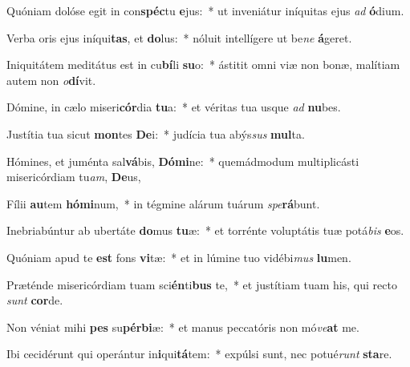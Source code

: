 \item Quóniam dolóse egit in con\textbf{spéc}tu \textbf{e}jus:~* ut inveniátur iníquitas ejus \textit{ad} \textbf{ó}dium.
\item Verba oris ejus iníqui\textbf{tas}, et \textbf{do}lus:~* nóluit intellígere ut be\textit{ne} \textbf{á}geret.
\item Iniquitátem meditátus est in cu\textbf{bí}li \textbf{su}o:~* ástitit omni viæ non bonæ, malítiam autem non \textit{o}\textbf{dí}vit.
\item Dómine, in cælo miseri\textbf{cór}dia \textbf{tu}a:~* et véritas tua usque \textit{ad} \textbf{nu}bes.
\item Justítia tua sicut \textbf{mon}tes \textbf{De}i:~* judícia tua abýs\textit{sus} \textbf{mul}ta.
\item Hómines, et juménta sal\textbf{vá}bis, \textbf{Dó}\textbf{mi}ne:~* quemádmodum multiplicásti misericórdiam tu\textit{am}, \textbf{De}us,
\item Fílii \textbf{au}tem \textbf{hó}\textbf{mi}num,~* in tégmine alárum tuárum \textit{spe}\textbf{rá}bunt.
\item Inebriabúntur ab ubertáte \textbf{do}mus \textbf{tu}æ:~* et torrénte voluptátis tuæ potá\textit{bis} \textbf{e}os.
\item Quóniam apud te \textbf{est} fons \textbf{vi}tæ:~* et in lúmine tuo vidébi\textit{mus} \textbf{lu}men.
\item Præténde misericórdiam tuam sci\textbf{én}ti\textbf{bus} te,~* et justítiam tuam his, qui recto \textit{sunt} \textbf{cor}de.
\item Non véniat mihi \textbf{pes} su\textbf{pér}\textbf{bi}æ:~* et manus peccatóris non mó\textit{ve}\textbf{at} me.
\item Ibi cecidérunt qui operántur in\textbf{i}qui\textbf{tá}tem:~* expúlsi sunt, nec potué\textit{runt} \textbf{sta}re.
